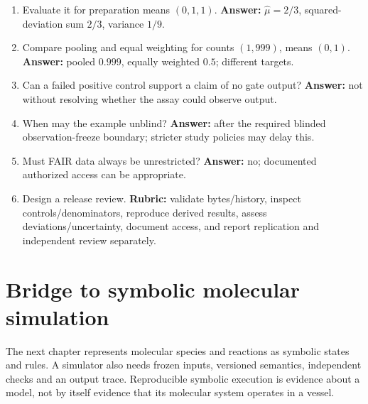 \begin{enumerate}
\textbf{Answer:} independent preparation sample variance divided by $R$ gives
$\sum_r(\bar y_r-\hat\mu)^2/[R(R-1)]$.
\item Evaluate it for preparation means $(0,1,1)$.
\textbf{Answer:} $\hat\mu=2/3$, squared-deviation sum $2/3$, variance $1/9$.
\item Compare pooling and equal weighting for counts $(1,999)$, means $(0,1)$.
\textbf{Answer:} pooled $0.999$, equally weighted $0.5$; different targets.
\item Can a failed positive control support a claim of no gate output?
\textbf{Answer:} not without resolving whether the assay could observe output.
\item When may the example unblind?
\textbf{Answer:} after the required blinded observation-freeze boundary;
stricter study policies may delay this.
\item Must FAIR data always be unrestricted?
\textbf{Answer:} no; documented authorized access can be appropriate.
\item Design a release review.
\textbf{Rubric:} validate bytes/history, inspect controls/denominators,
reproduce derived results, assess deviations/uncertainty, document access,
and report replication and independent review separately.
\end{enumerate}

\section{Bridge to symbolic molecular simulation}
The next chapter represents molecular species and reactions as symbolic
states and rules. A simulator also needs frozen inputs, versioned semantics,
independent checks and an output trace. Reproducible symbolic execution is evidence
about a model, not by itself evidence that its molecular system operates in a vessel.
